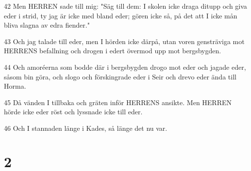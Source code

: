 \par 42 Men HERREN sade till mig: "Säg till dem: I skolen icke draga ditupp och giva eder i strid, ty jag är icke med bland eder; gören icke så, på det att I icke mån bliva slagna av edra fiender."
\par 43 Och jag talade till eder, men I hörden icke därpå, utan voren gensträviga mot HERRENS befallning och drogen i edert övermod upp mot bergsbygden.
\par 44 Och amoréerna som bodde där i bergsbygden drogo mot eder och jagade eder, såsom bin göra, och slogo och förskingrade eder i Seir och drevo eder ända till Horma.
\par 45 Då vänden I tillbaka och gräten inför HERRENS ansikte. Men HERREN hörde icke eder röst och lyssnade icke till eder.
\par 46 Och I stannaden länge i Kades, så länge det nu var.

\chapter{2}

